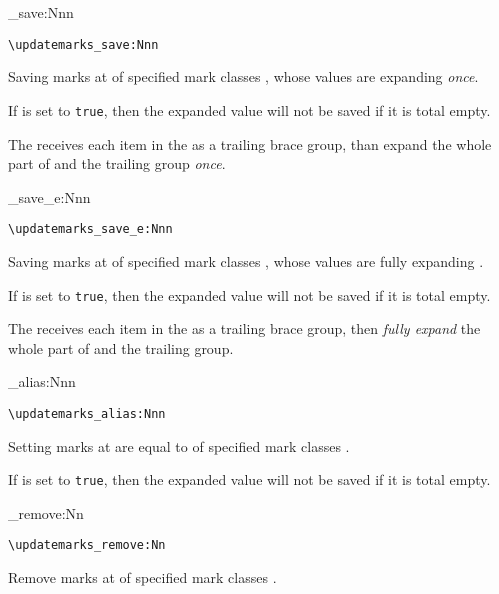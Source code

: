 \documentclass{l3doc}
\begin{document}
\begin{function}{\updatemarks_save:Nnn}
  \begin{syntax}
    \verb|\updatemarks_save:Nnn|   
  \end{syntax}
Saving marks at  of specified mark classes ,
whose values are expanding  \emph{once}.

If  is set to \texttt{true}, then the expanded value
will not be saved if it is total empty.

The  receives each item in the  
as a trailing brace group, than expand the whole part of
 and the trailing group \emph{once}.
\end{function}

\begin{function}{\updatemarks_save_e:Nnn}
  \begin{syntax}
    \verb|\updatemarks_save_e:Nnn|   
  \end{syntax}
Saving marks at  of specified mark classes ,
whose values are fully expanding .

If  is set to \texttt{true}, then the expanded value
will not be saved if it is total empty.

The  receives each item in the  
as a trailing brace group, then \emph{fully expand} the whole part of 
 and the trailing group.
\end{function}

\begin{function}{\updatemarks_alias:Nnn}
  \begin{syntax}
    \verb|\updatemarks_alias:Nnn|   
  \end{syntax}
Setting marks at  are equal to  
of specified mark classes .

If  is set to \texttt{true}, then the expanded value
will not be saved if it is total empty.
\end{function}

\begin{function}{\updatemarks_remove:Nn}
  \begin{syntax}
    \verb|\updatemarks_remove:Nn|  
  \end{syntax}
Remove marks at  of specified mark classes .
\end{function}
\end{document}
